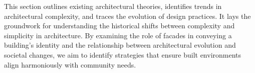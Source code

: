 








This section outlines existing architectural theories, identifies trends in architectural complexity, and traces the evolution of design practices.
It lays the groundwork for understanding the historical shifts between complexity and simplicity in architecture.
By examining the role of facades in conveying a building's identity and the relationship between architectural evolution and societal changes, we aim to identify strategies that ensure built environments align harmoniously with community needs.

